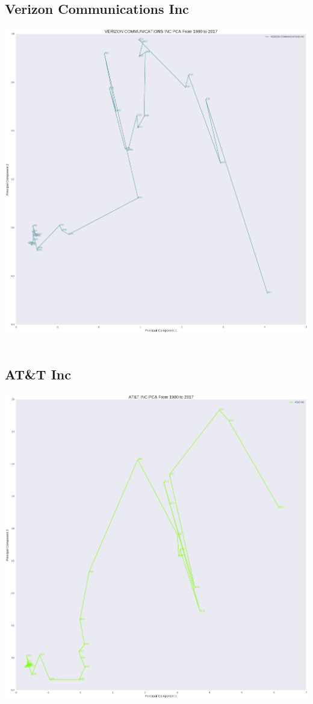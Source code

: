 \subsection{Verizon Communications Inc}
\includegraphics[width=1\textwidth]{./Verizon}\\[0.1in] \\
\subsection{AT\&T Inc}
\includegraphics[width=1\textwidth]{./ATT}\\[0.1in] \\

